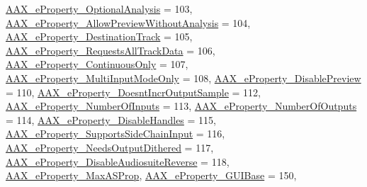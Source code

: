 \begin{DoxyCompactItemize}
\newline
\mbox{\hyperlink{a00662_a13e384f22825afd3db6d68395b79ce0da5a2bacb421fc36f890a121f01a9e72ba}{A\+A\+X\+\_\+e\+Property\+\_\+\+Optional\+Analysis}} = 103, 
\mbox{\hyperlink{a00662_a13e384f22825afd3db6d68395b79ce0da9524773361ca8e712bef3547e8c46c9b}{A\+A\+X\+\_\+e\+Property\+\_\+\+Allow\+Preview\+Without\+Analysis}} = 104, 
\mbox{\hyperlink{a00662_a13e384f22825afd3db6d68395b79ce0dadd8839e5678c8880215e318197cc8d3a}{A\+A\+X\+\_\+e\+Property\+\_\+\+Destination\+Track}} = 105, 
\mbox{\hyperlink{a00662_a13e384f22825afd3db6d68395b79ce0daa59caaf3d7c3e195a32b8cb09a9baac2}{A\+A\+X\+\_\+e\+Property\+\_\+\+Requests\+All\+Track\+Data}} = 106, 
\newline
\mbox{\hyperlink{a00662_a13e384f22825afd3db6d68395b79ce0da95054276be8782d93437cd74669366d0}{A\+A\+X\+\_\+e\+Property\+\_\+\+Continuous\+Only}} = 107, 
\mbox{\hyperlink{a00662_a13e384f22825afd3db6d68395b79ce0daa15cf3edd899af4a98fa18fcdfdeb9d6}{A\+A\+X\+\_\+e\+Property\+\_\+\+Multi\+Input\+Mode\+Only}} = 108, 
\mbox{\hyperlink{a00662_a13e384f22825afd3db6d68395b79ce0da854fdc19ab908b67aa3bc1f4262aa288}{A\+A\+X\+\_\+e\+Property\+\_\+\+Disable\+Preview}} = 110, 
\mbox{\hyperlink{a00662_a13e384f22825afd3db6d68395b79ce0daaf6b47f0861af74ef5c5bb316481b97d}{A\+A\+X\+\_\+e\+Property\+\_\+\+Doesnt\+Incr\+Output\+Sample}} = 112, 
\newline
\mbox{\hyperlink{a00662_a13e384f22825afd3db6d68395b79ce0da00ed3da39077c52ef259f350837fc981}{A\+A\+X\+\_\+e\+Property\+\_\+\+Number\+Of\+Inputs}} = 113, 
\mbox{\hyperlink{a00662_a13e384f22825afd3db6d68395b79ce0dab7e07d482d3b6e527fc13bbc9f4eaf63}{A\+A\+X\+\_\+e\+Property\+\_\+\+Number\+Of\+Outputs}} = 114, 
\mbox{\hyperlink{a00662_a13e384f22825afd3db6d68395b79ce0da943c37cd8a41a4d271dd28c89b518044}{A\+A\+X\+\_\+e\+Property\+\_\+\+Disable\+Handles}} = 115, 
\mbox{\hyperlink{a00662_a13e384f22825afd3db6d68395b79ce0da3399fcd8ff459de1e3de0c98d40a5094}{A\+A\+X\+\_\+e\+Property\+\_\+\+Supports\+Side\+Chain\+Input}} = 116, 
\newline
\mbox{\hyperlink{a00662_a13e384f22825afd3db6d68395b79ce0da38a26f7d914d391cef1f71acfb98a2ec}{A\+A\+X\+\_\+e\+Property\+\_\+\+Needs\+Output\+Dithered}} = 117, 
\mbox{\hyperlink{a00662_a13e384f22825afd3db6d68395b79ce0dab4eefd3dd46fb71883fff754c4f90a57}{A\+A\+X\+\_\+e\+Property\+\_\+\+Disable\+Audiosuite\+Reverse}} = 118, 
\mbox{\hyperlink{a00662_a13e384f22825afd3db6d68395b79ce0dac1731b45ed9daa8380c224c9d2b4050a}{A\+A\+X\+\_\+e\+Property\+\_\+\+Max\+A\+S\+Prop}}, 
\mbox{\hyperlink{a00662_a13e384f22825afd3db6d68395b79ce0da045b9ab3f8a4f63f9c62e1dffc1952aa}{A\+A\+X\+\_\+e\+Property\+\_\+\+G\+U\+I\+Base}} = 150, 

\end{DoxyCompactItemize}
